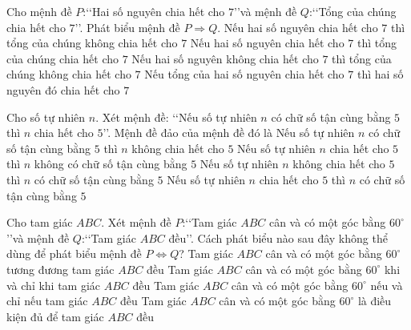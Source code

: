 \begin{ex}
	Cho mệnh đề $P$:\lq\lq  Hai số nguyên chia hết cho $7$\rq\rq và mệnh đề $Q$:\lq\lq  Tổng của chúng chia hết cho $7$\rq\rq. Phát biểu mệnh đề $P\Rightarrow Q$.
	\choice
	{Nếu hai số nguyên chia hết cho $7$ thì tổng của chúng không chia hết cho $7$}
	{\True Nếu hai số nguyên chia hết cho $7$ thì tổng của chúng chia hết cho $7$}
	{Nếu hai số nguyên không chia hết cho $7$ thì tổng của chúng không chia hết cho $7$}
	{Nếu tổng của hai số nguyên chia hết cho $7$ thì hai số nguyên đó chia hết cho $7$}
\end{ex}
\begin{ex}
	Cho số tự nhiên $n$. Xét mệnh đề: \lq\lq  Nếu số tự nhiên $n$ có chữ số tận cùng bằng $5$ thì $n$ chia hết cho $5$\rq\rq. Mệnh đề đảo của mệnh đề đó là
	\choice
	{Nếu số tự nhiên $n$ có chữ số tận cùng bằng $5$ thì $n$ không chia hết cho $5$}
	{Nếu số tự nhiên $n$ chia hết cho $5$ thì $n$ không có chữ số tận cùng bằng $5$}
	{Nếu số tự nhiên $n$ không chia hết cho $5$ thì $n$ có chữ số tận cùng bằng $5$}
	{\True Nếu số tự nhiên $n$ chia hết cho $5$ thì $n$ có chữ số tận cùng bằng $5$}
\end{ex}
\begin{ex}
	Cho tam giác $ABC$. Xét mệnh đề $P$:\lq\lq  Tam giác $ABC$ cân và có một góc bằng $60^\circ $\rq\rq và mệnh đề $Q$:\lq\lq  Tam giác $ABC$ đều\rq\rq. Cách phát biểu nào sau đây không thể dùng để phát biểu mệnh đề $P\Leftrightarrow Q$?
	\choice
	{Tam giác $ABC$ cân và có một góc bằng $60^\circ $ tương đương tam giác $ABC$ đều}
	{Tam giác $ABC$ cân và có một góc bằng $60^\circ $ khi và chỉ khi tam giác $ABC$ đều}
	{Tam giác $ABC$ cân và có một góc bằng $60^\circ $ nếu và chỉ nếu tam giác $ABC$ đều}
	{\True Tam giác $ABC$ cân và có một góc bằng $60^\circ $ là điều kiện đủ để tam giác $ABC$ đều}
\end{ex}
